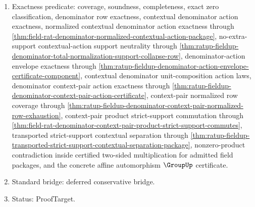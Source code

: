 \begin{enumerate}
  \autoref{thm:ratup-fieldup-transported-strict-support-contextual-separation-package},
  \autoref{thm:field-affine-automorphism-group-certificate}, and distributivity
  inherited from $\CommRingUp$.
  \item Exactness predicate: coverage, soundness, completeness, exact zero
  classification, denominator row exactness, contextual denominator action
  exactness, normalized contextual denominator action exactness through
  \autoref{thm:field-rat-denominator-normalized-contextual-action-package},
  no-extra-support contextual-action support neutrality through
  \autoref{thm:ratup-fieldup-denominator-total-normalization-support-collapse-row},
  denominator-action envelope exactness through
  \autoref{thm:ratup-fieldup-denominator-action-envelope-certificate-component},
  contextual denominator unit-composition action laws, denominator context-pair
  action exactness through
  \autoref{thm:ratup-fieldup-denominator-context-pair-action-certificate},
  context-pair normalized row coverage through
  \autoref{thm:ratup-fieldup-denominator-context-pair-normalized-row-exhaustion},
  context-pair product strict-support commutation through
  \autoref{thm:field-rat-denominator-context-pair-product-strict-support-commutes},
  transported strict-support contextual separation through
  \autoref{thm:ratup-fieldup-transported-strict-support-contextual-separation-package},
  nonzero-product contradiction inside certified two-sided multiplication for
  admitted field packages, and the concrete affine automorphism $\GroupUp$
  certificate.
  \item Standard bridge: deferred conservative bridge.
  \item Status: ProofTarget.
\end{enumerate}

